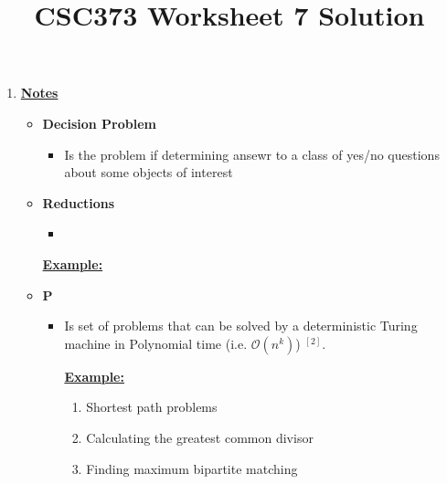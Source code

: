 \documentclass[12pt]{article}
\begin{document}
\title{CSC373 Worksheet 7 Solution}
\maketitle

\bigskip

\begin{enumerate}[1.]
    \item

    \bigskip

    \underline{\textbf{Notes}}

    \begin{itemize}
        \item \textbf{Decision Problem}

        \begin{itemize}
            \item Is the problem if determining ansewr to a class of yes/no questions
            about some objects of interest
        \end{itemize}

        \bigskip

        \item \textbf{Reductions}

        \begin{itemize}
            \item
        \end{itemize}

        \underline{\textbf{Example:}}

        \item \textbf{P}

        \begin{itemize}
            \item Is set of problems that can be solved by a deterministic Turing machine in Polynomial time (i.e. $\mathcal{O}(n^k)$) $^{[2]}$.

            \bigskip

            \underline{\textbf{Example:}}

            \bigskip

            \begin{enumerate}[1)]
                \item Shortest path problems
                \item Calculating the greatest common divisor
                \item Finding maximum bipartite matching
            \end{enumerate}


\end{itemize}
\end{itemize}
\end{enumerate}
\end{document}

